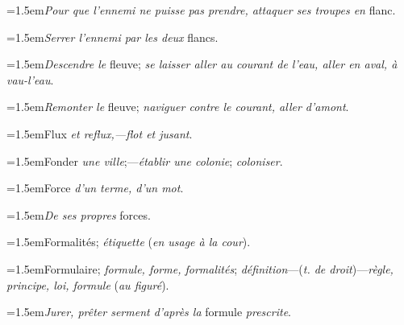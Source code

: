 \par{\dictfontsize\hangindent=1.5em\noindent \textit{Pour que l’ennemi ne puisse pas prendre, attaquer ses troupes en} flanc. \par}
\par{\dictfontsize\hangindent=1.5em\noindent \textit{Serrer l’ennemi par les deux} flancs. \par}
\par{\dictfontsize\hangindent=1.5em\noindent \textit{Descendre le} fleuve; \textit{se laisser aller au courant de l’eau, aller en aval, à vau-l’eau}. \par}
\par{\dictfontsize\hangindent=1.5em\noindent \textit{Remonter le} fleuve; \textit{naviguer contre le courant, aller d’amont}. \par}
\par{\dictfontsize\hangindent=1.5em\noindent Flux \textit{et reflux,—flot et jusant}. \par}
\par{\dictfontsize\hangindent=1.5em\noindent Fonder \textit{une ville};—\textit{établir une colonie}; \textit{coloniser}. \par}
\par{\dictfontsize\hangindent=1.5em\noindent Force \textit{d’un terme, d’un mot}. \par}
\par{\dictfontsize\hangindent=1.5em\noindent \textit{De ses propres} forces. \par}
\par{\dictfontsize\hangindent=1.5em\noindent Formalités; \textit{étiquette} (\textit{en usage à la cour}). \par}
\par{\dictfontsize\hangindent=1.5em\noindent Formulaire; \textit{formule, forme, formalités}; \textit{définition}—(\textit{t. de droit})—\textit{règle, principe, loi, formule} (\textit{au figuré}). \par}
\par{\dictfontsize\hangindent=1.5em\noindent \textit{Jurer, prêter serment d’après la} formule \textit{prescrite}. \par}
